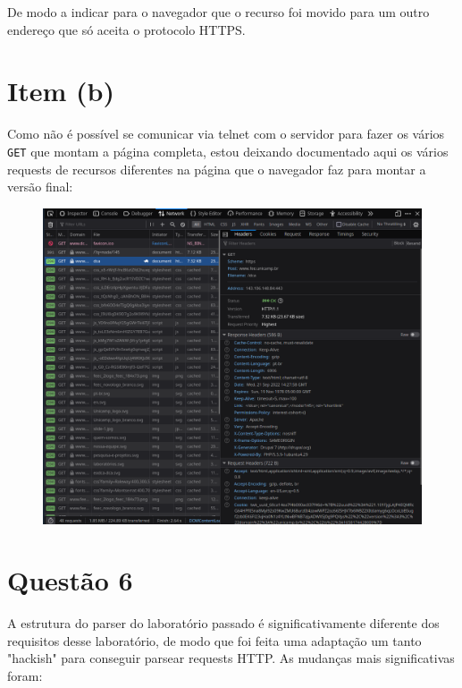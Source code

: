 \documentclass{article}
\begin{document}
De modo a indicar para o navegador que o recurso foi movido para um outro endereço que só aceita o protocolo HTTPS.

\newpage
\section*{Item (b)}

Como não é possível se comunicar via telnet com o servidor para fazer os vários \texttt{GET} que montam a página completa, estou deixando documentado aqui os vários requests de recursos diferentes na página que o navegador faz para montar a versão final:

\begin{figure}[!ht]
    \begin{center}
        \includegraphics[width=\textwidth]{images/requests.png}
    \end{center}
\end{figure} 

\FloatBarrier
\newpage

\section*{Questão 6}

A estrutura do parser do laboratório passado é significativamente diferente dos requisitos desse laboratório, de modo que foi feita uma adaptação um tanto "hackish" para conseguir parsear requests HTTP. As mudanças mais significativas foram:
\end{document}
